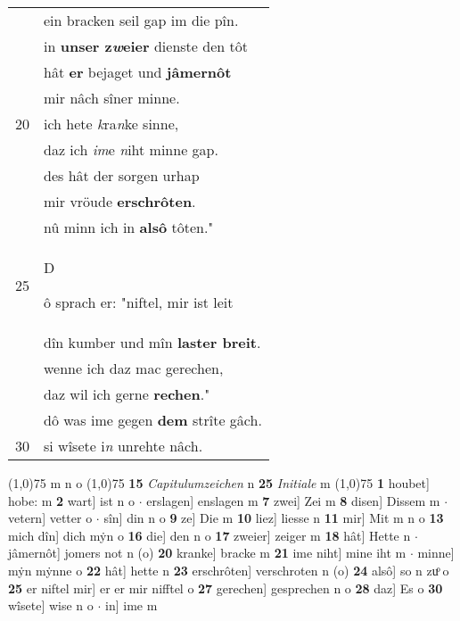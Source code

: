 \documentclass[8pt,a4paper,notitlepage]{article}
\begin{document}
\begin{table}[ht]
\begin{minipage}[t]{0.5\linewidth}
\begin{tabular}{rl}
 & ein bracken seil gap im die pîn.\\ 
 & in \textbf{unser z\textit{w}eier} dienste den tôt\\ 
 & hât \textbf{er} bejaget und \textbf{jâmernôt}\\ 
 & mir nâch sîner minne.\\ 
20 & ich hete \textit{k}ra\textit{n}ke sinne,\\ 
 & daz ich \textit{im}e \textit{n}iht minne gap.\\ 
 & des hât der sorgen urhap\\ 
 & mir vröude \textbf{erschrôten}.\\ 
 & nû minn ich in \textbf{alsô} tôten."\\ 
25 & \begin{large}D\end{large}ô sprach er: "niftel, mir ist leit\\ 
 & dîn kumber und mîn \textbf{laster breit}.\\ 
 & wenne ich daz mac gerechen,\\ 
 & daz wil ich gerne \textbf{rechen}."\\ 
 & dô was ime gegen \textbf{dem} strîte gâch.\\ 
30 & si wîsete i\textit{n} unrehte nâch.\\ 
\end{tabular}
\scriptsize
\line(1,0){75} \newline
m n o \newline
\line(1,0){75} \newline
\textbf{15} \textit{Capitulumzeichen} n  \textbf{25} \textit{Initiale} m  \newline
\line(1,0){75} \newline
\textbf{1} houbet] hobe: m \textbf{2} wart] ist n o  $\cdot$ erslagen] enslagen m \textbf{7} zwei] Zei m \textbf{8} disen] Dissem m  $\cdot$ vetern] vetter o  $\cdot$ sîn] din n o \textbf{9} ze] Die m \textbf{10} liez] liesse n \textbf{11} mir] Mit m n o \textbf{13} mich dîn] dich mẏn o \textbf{16} die] den n o \textbf{17} zweier] zeiger m \textbf{18} hât] Hette n  $\cdot$ jâmernôt] jomers not n (o) \textbf{20} kranke] bracke m \textbf{21} ime niht] mine iht m  $\cdot$ minne] mẏn mẏnne o \textbf{22} hât] hette n \textbf{23} erschrôten] verschroten n (o) \textbf{24} alsô] so n zuͦ o \textbf{25} er niftel mir] er er mir nifftel o \textbf{27} gerechen] gesprechen n o \textbf{28} daz] Es o \textbf{30} wîsete] wise n o  $\cdot$ in] ime m \newline
\end{minipage}
\end{table}
\end{document}
